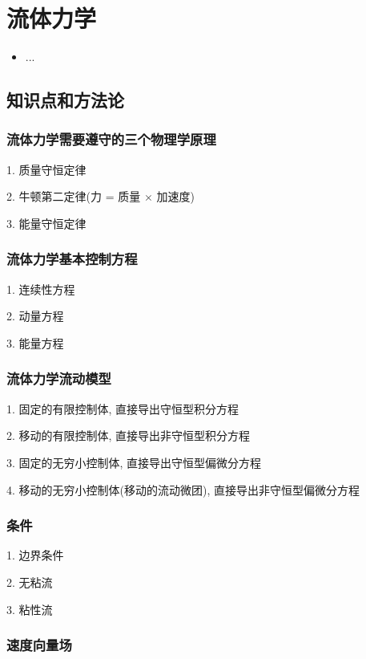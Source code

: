 \chapter{流体力学}
\label{chap1}
\begin{itemize}[noitemsep,topsep=0pt,parsep=0pt,partopsep=0pt]
	\item ...
\end{itemize}

\section{知识点和方法论}


\subsection{流体力学需要遵守的三个物理学原理}

1. 质量守恒定律

2. 牛顿第二定律(力 = 质量 $\times$ 加速度)

3. 能量守恒定律

\subsection{流体力学基本控制方程}

1. 连续性方程

2. 动量方程

3. 能量方程

\subsection{流体力学流动模型}

1. 固定的有限控制体, 直接导出守恒型积分方程

2. 移动的有限控制体, 直接导出非守恒型积分方程

3. 固定的无穷小控制体, 直接导出守恒型偏微分方程

4. 移动的无穷小控制体(移动的流动微团), 直接导出非守恒型偏微分方程

\subsection{条件}
1. 边界条件

2. 无粘流

3. 粘性流

\subsection{速度向量场}

